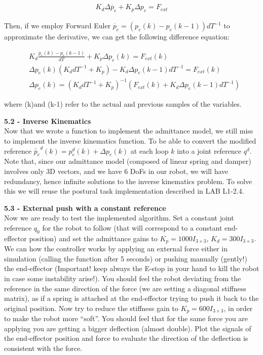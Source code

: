 \documentclass[11pt]{article}
\begin{document}
\begin{align*}
K_d \Delta\dot{ p_e} + K_p{\Delta p_e}  =  F_{ext}  
\end{align*}
 
Then, if  we  employ Forward Euler $\dot{p_e} = (p_e(k)- p_e(k-1))dT^{-1}$ to approximate the derivative, we can get the following difference equation:

\begin{align*}
&K_d \frac{p_e(k)- p_e(k-1)}{dT}  + K_p \Delta p_e(k)  =  F_{ext}(k)  \\
&\Delta p_e(k) (K_d dT^{-1} + K_p ) - K_d \Delta p_e(k-1)dT^{-1} =  F_{ext}(k)\\
&\Delta p_e(k) =  (K_d dT^{-1} + K_p )^{-1} (F_{ext}(k) + K_d \Delta p_e(k-1)dT^{-1})
\end{align*}

where (k)and (k-1) refer to the actual and previous samples of the variables. 


\quad

\noindent
\textbf{5.2 - Inverse Kinematics}\\
Now that we wrote a function to implement the admittance model, we still miss to implement the inverse kinematics function. To be able to convert the modified reference $\tilde{p_e}^d(k) = p_e^d(k) +  \Delta p_e(k)$  at each loop $k$ into a joint reference $q^d$. Note that, since our admittance model (composed of linear spring and damper)  involves only 3D vectors, and we have 6 DoFs in our robot, we will have redundancy, hence  infinite solutions to the inverse kinematics problem. To solve this we will reuse the postural task implementation described in LAB L1-2.4.


\quad

\noindent
\textbf{5.3 - External push with a constant reference}\\
Now we are ready to test the implemented algorithm. Set  a constant joint reference $q_0$  for the robot to follow (that will correspond to a constant end-effector position) and set the admittance gains to $K_p = 1000I_{3\times3}$,  $K_d = 300I_{3\times3}$. We can how the controller works by applying an external force either in simulation (calling the function  after 5 seconds) or pushing manually (gently!) the end-effector (Important! keep always the E-stop in your hand to kill the robot in case some instability arise!). You should feel the robot deviating from the reference in the same direction of the force (we are setting a diagonal stiffness matrix), as if a spring is attached at the end-effector trying to push it back to the original position. 
Now try to reduce the stiffness gain to $K_p = 600I_{3\times3}$, in order to make the robot more ``soft''. You should feel that for the same force you are applying you are getting a bigger deflection (almost double).
Plot the signals of the end-effector position and force to evaluate the direction of the deflection is consistent with the force.
\end{document}
